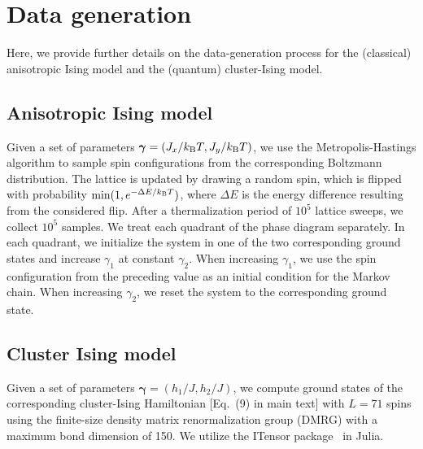 \section{Data generation}
Here, we provide further details on the data-generation process for the (classical) anisotropic Ising model and the (quantum) cluster-Ising model.
\subsection{Anisotropic Ising model}
Given a set of parameters $\bm{\gamma}=(J_{x}/k_{\rm B}T,J_{y}/k_{\rm B}T)$, we use the Metropolis-Hastings algorithm to sample spin configurations from the corresponding Boltzmann distribution. The lattice is updated by drawing a random spin, which is flipped with probability ${\rm min}(1, e^{-\Delta E/k_{\rm B}T})$, where $\Delta E$ is the energy difference resulting from the considered flip. After a thermalization period of $10^5$ lattice sweeps, we collect $10^{5}$ samples. We treat each quadrant of the phase diagram separately. In each quadrant, we initialize the system in one of the two corresponding ground states and increase $\gamma_{1}$ at constant $\gamma_{2}$. When increasing $\gamma_{1}$, we use the spin configuration from the preceding value as an initial condition for the Markov chain. When increasing $\gamma_{2}$, we reset the system to the corresponding ground state.

\subsection{Cluster Ising model}
Given a set of parameters $\bm{\gamma}=(h_{1}/J,h_{2}/J)$, we compute ground states of the corresponding cluster-Ising Hamiltonian [Eq.~(9) in main text] with $L = 71$ spins using the finite-size density matrix renormalization group (DMRG) with a maximum bond dimension of 150. We utilize the ITensor package~\cite{itensor} in Julia.